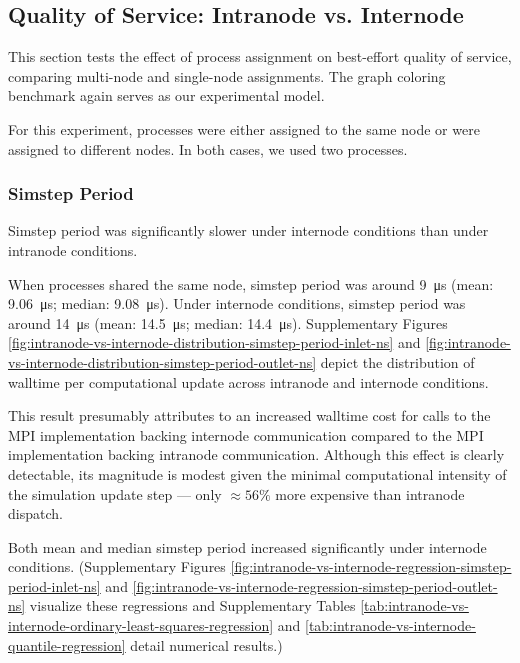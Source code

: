 \subsection{Quality of Service: Intranode vs. Internode}
\label{sec:intranode-vs-internode}

This section tests the effect of process assignment on best-effort quality of service, comparing multi-node and single-node assignments.
The graph coloring benchmark again serves as our experimental model.

For this experiment, processes were either assigned to the same node or were assigned to different nodes.
In both cases, we used two processes.

\subsubsection{Simstep Period}

Simstep period was significantly slower under internode conditions than under intranode conditions.

When processes shared the same node, simstep period was around \SI{9}{\micro\second} (mean: \SI{9.06}{\micro\second}; median: \SI{9.08}{\micro\second}).
Under internode conditions, simstep period was around \SI{14}{\micro\second} (mean: \SI{14.5}{\micro\second}; median: \SI{14.4}{\micro\second}).
Supplementary Figures \ref{fig:intranode-vs-internode-distribution-simstep-period-inlet-ns} and \ref{fig:intranode-vs-internode-distribution-simstep-period-outlet-ns} depict the distribution of walltime per computational update across intranode and internode conditions.

This result presumably attributes to an increased walltime cost for calls to the MPI implementation backing internode communication compared to the MPI implementation backing intranode communication.
Although this effect is clearly detectable, its magnitude is modest given the minimal computational intensity of the simulation update step --- only $\approx 56\%$ more expensive than intranode dispatch.

Both mean and median simstep period increased significantly under internode conditions.
(Supplementary Figures \ref{fig:intranode-vs-internode-regression-simstep-period-inlet-ns} and \ref{fig:intranode-vs-internode-regression-simstep-period-outlet-ns} visualize these regressions and Supplementary Tables \ref{tab:intranode-vs-internode-ordinary-least-squares-regression} and \ref{tab:intranode-vs-internode-quantile-regression} detail numerical results.)

